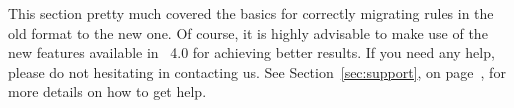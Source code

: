 This section pretty much covered the basics for correctly migrating rules in the old format to the new one. Of course, it is highly advisable to make use of the new features available in \arara\ 4.0 for achieving better results. If you need any help, please do not hesitating in contacting us. See Section~\ref{sec:support}, on page~\pageref{sec:support}, for more details on how to get help.
